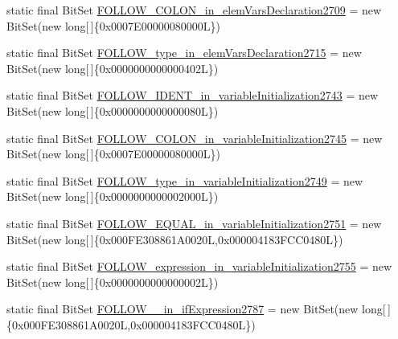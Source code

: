\begin{DoxyCompactItemize}
\item 
static final Bit\-Set \hyperlink{classorg_1_1tzi_1_1use_1_1parser_1_1testsuite_1_1_test_suite_parser_a1ccd1065ccaf76113224fc4909822124}{F\-O\-L\-L\-O\-W\-\_\-\-C\-O\-L\-O\-N\-\_\-in\-\_\-elem\-Vars\-Declaration2709} = new Bit\-Set(new long\mbox{[}$\,$\mbox{]}\{0x0007\-E00000080000\-L\})
\item 
static final Bit\-Set \hyperlink{classorg_1_1tzi_1_1use_1_1parser_1_1testsuite_1_1_test_suite_parser_abf03e1fab9335668e7bf877fde89fbab}{F\-O\-L\-L\-O\-W\-\_\-type\-\_\-in\-\_\-elem\-Vars\-Declaration2715} = new Bit\-Set(new long\mbox{[}$\,$\mbox{]}\{0x0000000000000402\-L\})
\item 
static final Bit\-Set \hyperlink{classorg_1_1tzi_1_1use_1_1parser_1_1testsuite_1_1_test_suite_parser_ac912f49be3dd7b5d5ad754cf68671f5e}{F\-O\-L\-L\-O\-W\-\_\-\-I\-D\-E\-N\-T\-\_\-in\-\_\-variable\-Initialization2743} = new Bit\-Set(new long\mbox{[}$\,$\mbox{]}\{0x0000000000000080\-L\})
\item 
static final Bit\-Set \hyperlink{classorg_1_1tzi_1_1use_1_1parser_1_1testsuite_1_1_test_suite_parser_a08cf74153b84237641ef4db1ef6d58d0}{F\-O\-L\-L\-O\-W\-\_\-\-C\-O\-L\-O\-N\-\_\-in\-\_\-variable\-Initialization2745} = new Bit\-Set(new long\mbox{[}$\,$\mbox{]}\{0x0007\-E00000080000\-L\})
\item 
static final Bit\-Set \hyperlink{classorg_1_1tzi_1_1use_1_1parser_1_1testsuite_1_1_test_suite_parser_afab09dc10f0d28dd1a717d4e4ac6b445}{F\-O\-L\-L\-O\-W\-\_\-type\-\_\-in\-\_\-variable\-Initialization2749} = new Bit\-Set(new long\mbox{[}$\,$\mbox{]}\{0x0000000000002000\-L\})
\item 
static final Bit\-Set \hyperlink{classorg_1_1tzi_1_1use_1_1parser_1_1testsuite_1_1_test_suite_parser_adcfedf31297b89fe6752b7c464f87baf}{F\-O\-L\-L\-O\-W\-\_\-\-E\-Q\-U\-A\-L\-\_\-in\-\_\-variable\-Initialization2751} = new Bit\-Set(new long\mbox{[}$\,$\mbox{]}\{0x000\-F\-E308861\-A0020\-L,0x000004183\-F\-C\-C0480\-L\})
\item 
static final Bit\-Set \hyperlink{classorg_1_1tzi_1_1use_1_1parser_1_1testsuite_1_1_test_suite_parser_a323132844841f881f2ab9fe5c577f8d2}{F\-O\-L\-L\-O\-W\-\_\-expression\-\_\-in\-\_\-variable\-Initialization2755} = new Bit\-Set(new long\mbox{[}$\,$\mbox{]}\{0x0000000000000002\-L\})
\item 
static final Bit\-Set \hyperlink{classorg_1_1tzi_1_1use_1_1parser_1_1testsuite_1_1_test_suite_parser_a0a40bfecffc5e6b65de99dbc1fe4c534}{F\-O\-L\-L\-O\-W\-\_\-\_\-in\-\_\-if\-Expression2787} = new Bit\-Set(new long\mbox{[}$\,$\mbox{]}\{0x000\-F\-E308861\-A0020\-L,0x000004183\-F\-C\-C0480\-L\})

\end{DoxyCompactItemize}
